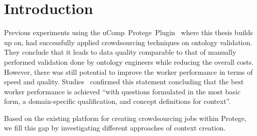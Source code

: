 \section{Introduction}\label{sec:approaches_introduction}
Previous experiments using the uComp~Protege~Plugin~\cite{wohlgenannt2016} where this thesis builds up on, had successfully applied crowdsourcing techniques on ontology validation. They conclude that it leads to data quality comparable to that of manually performed validation done by ontology engineers while reducing the overall costs. However, there was still potential to improve the worker performance in terms of speed and quality. 
Studies~\cite{mortensen2013} confirmed this statement concluding that the best worker performance is achieved
\enquote{with questions formulated in the most basic form, a domain-specific qualification, and concept definitions for context}.

Based on the existing platform for creating crowdsourcing jobs within Protege, we fill this gap by investigating different approaches of context creation. 